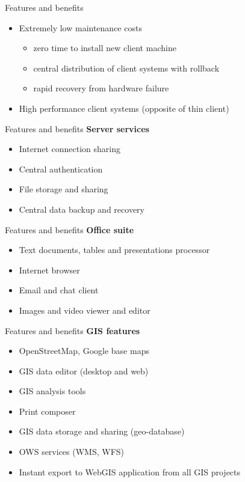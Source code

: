 \documentclass[12pt]{beamer}
\begin{document}
\begin{frame}{Features and benefits}
	\begin{itemize}
		\item Extremely low maintenance costs
		\begin{itemize}
			\item zero time to install new client machine
			\item central distribution of client systems with rollback
			\item rapid recovery from hardware failure
		\end{itemize}
		\item High performance client systems (opposite of thin client)
	\end{itemize}
\end{frame}


\begin{frame}{Features and benefits}
	\textbf{Server services}
	\begin{itemize}
		\item Internet connection sharing
		\item Central authentication
		\item File storage and sharing
		\item Central data backup and recovery
	\end{itemize}
\end{frame}


\begin{frame}{Features and benefits}
	\textbf{Office suite}
	\begin{itemize}
		\item Text documents, tables and presentations processor
		\item Internet browser
		\item Email and chat client
		\item Images and video viewer and editor
	\end{itemize}
\end{frame}


\begin{frame}{Features and benefits}
	\textbf{GIS features}
	\begin{itemize}
		\item OpenStreetMap, Google base maps
		\item GIS data editor (desktop and web)
		\item GIS analysis tools
		\item Print composer
		\item GIS data storage and sharing (geo-database)
		\item OWS services (WMS, WFS)
		\item Instant export to WebGIS application from all GIS projects
	\end{itemize}
\end{frame}
\end{document}
